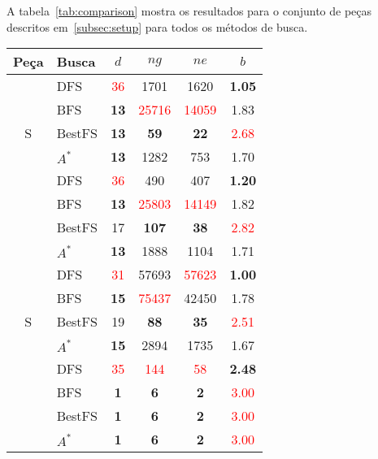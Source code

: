 A tabela~\ref{tab:comparison} mostra os resultados para o conjunto de peças descritos em~\ref{subsec:setup} para todos os métodos de busca.
	\begin{table}[ h ]
		\centering
		\begin{tabular}{|c|l|c|c|c|c|}
			\hline
			Peça & Busca & $d$ & $ng$ & $ne$ & $b$ \\ \hline
			\multirow{5}{*}{S} & DFS & \textcolor{red}{36} & 1701 & 1620 & \textbf{1.05} \\ \cline{2-6}
					& BFS & \textbf{13} & \textcolor{red}{25716} & \textcolor{red}{14059} & 1.83  \\ \cline{2-6}
					& BestFS & \textbf{13} & \textbf{59} & \textbf{22} & \textcolor{red}{2.68}  \\ \cline{2-6}
					& $A^*$ & \textbf{13} & 1282 & 753 & 1.70 \\ \hline

			\multirow{5}{*}{Z} & DFS & \textcolor{red}{36} & 490 & 407 & \textbf{1.20} \\ \cline{2-6}
					& BFS & \textbf{13} & \textcolor{red}{25803} & \textcolor{red}{14149} & 1.82  \\ \cline{2-6}
					& BestFS & 17 & \textbf{107} & \textbf{38} & \textcolor{red}{2.82}  \\ \cline{2-6}
					& $A^*$ & \textbf{13} & 1888 & 1104 & 1.71 \\ \hline

			\multirow{5}{*}{S} & DFS & \textcolor{red}{31} & 57693 & \textcolor{red}{57623} & \textbf{1.00} \\ \cline{2-6}
					& BFS & \textbf{15} & \textcolor{red}{75437} & 42450 & 1.78  \\ \cline{2-6}
					& BestFS & 19 & \textbf{88} & \textbf{35} & \textcolor{red}{2.51}  \\ \cline{2-6}
					& $A^*$ & \textbf{15} & 2894 & 1735 & 1.67 \\ \hline

			\multirow{5}{*}{T} & DFS & \textcolor{red}{35} & \textcolor{red}{144} & \textcolor{red}{58} & \textbf{2.48} \\ \cline{2-6}
					& BFS & \textbf{1} & \textbf{6} & \textbf{2} & \textcolor{red}{3.00}  \\ \cline{2-6}
					& BestFS & \textbf{1} & \textbf{6} & \textbf{2} & \textcolor{red}{3.00}  \\ \cline{2-6}
					& $A^*$ & \textbf{1} & \textbf{6} & \textbf{2} & \textcolor{red}{3.00} \\ \hline


\end{tabular}
\end{table}
